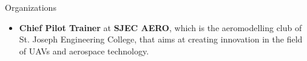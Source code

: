 \documentclass{resume} %
\begin{document}
\begin{rSection}{Organizations}
    \begin{itemize}
        \item 	\textbf{Chief Pilot Trainer} at \textbf{SJEC AERO}, which is the aeromodelling club of St. Joseph Engineering College, that aims at creating innovation in the field of UAVs and aerospace technology.



    \end{itemize}


\end{rSection}








\end{document}
